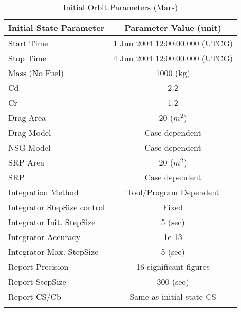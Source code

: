 \begin{table}[htbp!]
\centering \caption{Initial Orbit Parameters (Mars)}
      \begin{tabular}{lc}
      \hline\hline
            Initial State Parameter & Parameter Value (unit)\\
            \hline
            Start Time & 1 Jun 2004 12:00:00.000 (UTCG)\\
            Stop Time & 4 Jun 2004 12:00:00.000 (UTCG)\\
            
            Mass (No Fuel) & 1000 (kg)\\
            Cd & 2.2\\
            Cr & 1.2\\
            Drag Area & 20 ($m^2$)\\
            Drag Model & Case dependent\\
            NSG Model & Case dependent\\
            SRP Area & 20 ($m^2$)\\
            SRP & Case dependent\\
            Integration Method & Tool/Program Dependent\\
            Integrator StepSize control & Fixed\\
            Integrator Init. StepSize & 5 (sec)\\
            Integrator Accuracy & 1e-13\\
            Integrator Max. StepSize & 5 (sec)\\
            Report Precision & 16 significant figures\\
            Report StepSize & 300 (sec)\\
            Report CS/Cb & Same as initial state CS\\
      \hline\hline
      \label{Table: InitStateMars}
\end{tabular}
\end{table}

